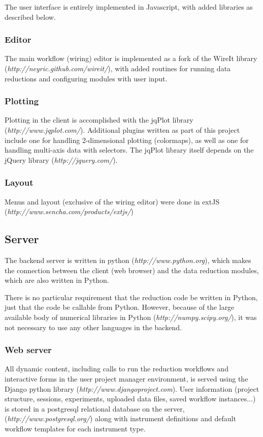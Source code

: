 \documentclass[pdf]{iucr}           %
\begin{document}
The user interface is entirely implemented in Javascript, with added libraries as described below.
 
\subsubsection{Editor}
The main workflow (wiring) editor is implemented as a fork of the WireIt library (\emph{http://neyric.github.com/wireit/}), with added routines for running data reductions and configuring
modules with user input.
\subsubsection{Plotting}
Plotting in the client is accomplished with the jqPlot library (\emph{http://www.jqplot.com/}).
Additional plugins written as part of this project include one for handling 2-dimensional 
plotting (colormaps), as well as one for handling multi-axis data with selectors.
The jqPlot library itself depends on the jQuery library (\emph{http://jquery.com/}).
\subsubsection{Layout}
Menus and layout (exclusive of the wiring editor) were done in extJS (\emph{http://www.sencha.com/products/extjs/})
\subsection{Server}
The backend server is written in python (\emph{http://www.python.org}), 
which makes the connection between the client (web browser) and the data reduction modules, 
which are also written in Python.  

There is no particular requirement that the reduction code be written in Python, just that
the code be callable from Python.  However, because of the large available body of numerical libraries 
in Python (\emph{http://numpy.scipy.org/}), 
it was not necessary to use any other languages in the backend.
\subsubsection{Web server}
All dynamic content, including calls to run the reduction workflows and
interactive forms in the user project manager environment,
is served using the Django python library (\emph{http://www.djangoproject.com}).  
User information (project structure, sessions, experiments, uploaded data files, saved workflow instances...)
is stored in a postgresql relational database on the server, (\emph{http://www.postgresql.org/})
along with instrument definitions and default workflow templates
for each instrument type.
\end{document}
